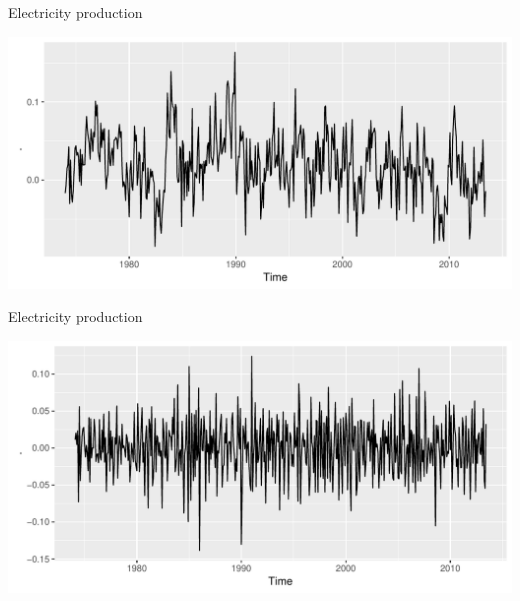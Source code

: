 \documentclass[14pt,ignorenonframetext,]{beamer}
\newenvironment{Shaded}{\begin{snugshade}}{\end{snugshade}}
\newcommand{\KeywordTok}[1]{\textcolor[rgb]{0.13,0.29,0.53}{\textbf{#1}}}
\newcommand{\DataTypeTok}[1]{\textcolor[rgb]{0.13,0.29,0.53}{#1}}
\newcommand{\DecValTok}[1]{\textcolor[rgb]{0.00,0.00,0.81}{#1}}
\newcommand{\StringTok}[1]{\textcolor[rgb]{0.31,0.60,0.02}{#1}}
\newcommand{\OperatorTok}[1]{\textcolor[rgb]{0.81,0.36,0.00}{\textbf{#1}}}
\newcommand{\NormalTok}[1]{#1}
\begin{document}
\begin{frame}[fragile]{Electricity production}

\begin{Shaded}
\end{Shaded}

\includegraphics{week_5_arima_files/figure-beamer/unnamed-chunk-15-1.pdf}

\end{frame}

\begin{frame}[fragile]{Electricity production}

\begin{Shaded}
\end{Shaded}

\includegraphics{week_5_arima_files/figure-beamer/unnamed-chunk-16-1.pdf}

\end{frame}
\end{document}
